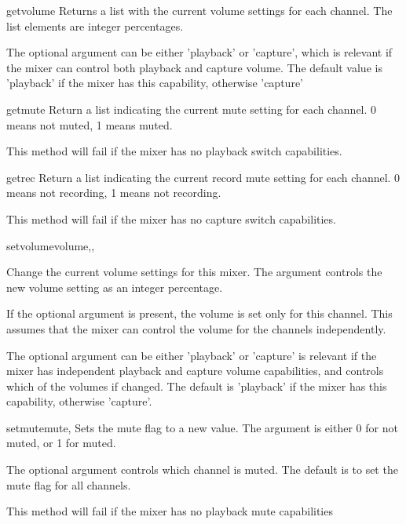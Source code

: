 \begin{methoddesc}[Mixer]{getvolume}{}
  Returns a list with the current volume settings for each channel.
  The list elements are integer percentages.

  The optional  argument can be either 'playback' or
  'capture', which is relevant if the mixer can control both playback
  and capture volume. The default value is 'playback' if the mixer has
  this capability, otherwise 'capture'

\end{methoddesc}

\begin{methoddesc}[Mixer]{getmute}{}
  Return a list indicating the current mute setting for each channel.
  0 means not muted, 1 means muted.

  This method will fail if the mixer has no playback switch
  capabilities.
\end{methoddesc}

\begin{methoddesc}[Mixer]{getrec}{}
  Return a list indicating the current record mute setting for each
  channel. 0 means not recording, 1 means not recording.

  This method will fail if the mixer has no capture switch
  capabilities.
\end{methoddesc}

\begin{methoddesc}[Mixer]{setvolume}{volume,,
    }

  Change the current volume settings for this mixer. The 
  argument controls the new volume setting as an integer percentage.

  If the optional argument  is present, the volume is set
  only for this channel. This assumes that the mixer can control the
  volume for the channels independently.

  The optional  argument can be either 'playback' or
  'capture' is relevant if the mixer has independent playback and
  capture volume capabilities, and controls which of the volumes if
  changed. The default is 'playback' if the mixer has this capability,
  otherwise 'capture'.
\end{methoddesc}

\begin{methoddesc}[Mixer]{setmute}{mute, }
  Sets the mute flag to a new value. The  argument is either
  0 for not muted, or 1 for muted.

  The optional  argument controls which channel is muted.
  The default is to set the mute flag for all channels.

  This method will fail if the mixer has no playback mute capabilities
\end{methoddesc}

